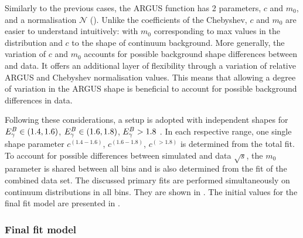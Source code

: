 Similarly to the previous cases, the ARGUS function has 2 parameters, $c$ and $m_0$, and a normalisation $\mathcal{N}$ ().
Unlike the coefficients of the Chebyshev, $c$ and $m_0$ are easier to understand intuitively: with $m_0$ corresponding to max \Mbc values in the distribution and $c$ to the shape of continuum background.
More generally, the variation of $c$ and $m_0$ accounts for possible background shape differences between \MC and data.
It offers an additional layer of flexibility through a variation of relative ARGUS and Chebyshev normalisation values.
This means that allowing a degree of variation in the ARGUS shape is beneficial to account for possible background differences in data.

Following these considerations, a setup is adopted with independent shapes for  ${E^B_{\gamma}}\in(1.4,1.6)$, ${E^B_{\gamma}}\in(1.6,1.8)$, ${E^B_{\gamma}}>1.8$ \gev.
In each respective range, one single shape parameter $c^{(1.4-1.6)}$, $c^{(1.6-1.8)}$, $c^{(>1.8)}$ is determined from the total fit.
To account for possible differences between simulated and data $\sqrt{s}$, the $m_0$ parameter is shared between all bins and is also determined from the fit of the combined data set.
The discussed primary fits are performed simultaneously on continuum \Mbc distributions in all \EB bins.
They are shown in .
The initial values for the final \Mbc fit model are presented in .

\subsubsection{Final fit model}

